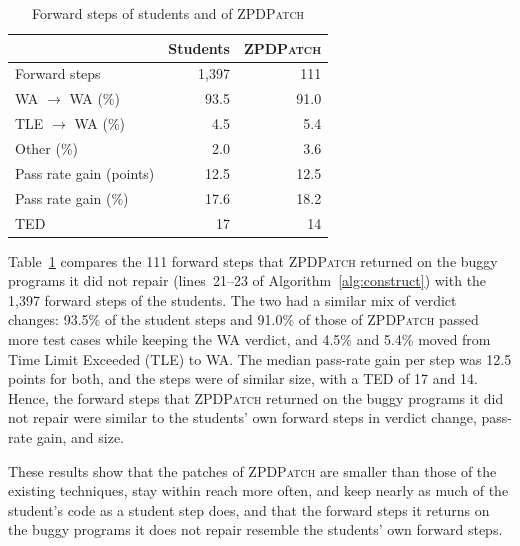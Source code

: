\documentclass[conference]{IEEEtran}
\begin{document}
\begin{table}[h]
\caption{Forward steps of students and of \textsc{ZPDPatch}}
\label{tab:rq1steps}
\centering\footnotesize
\begin{tabular}{@{}l||rr@{}}
\toprule
 & Students & \textsc{ZPDPatch} \\
\midrule
Forward steps & 1,397 & 111 \\
\midrule
WA $\to$ WA (\%) & 93.5 & 91.0 \\
TLE $\to$ WA (\%) & 4.5 & 5.4 \\
Other (\%) & 2.0 & 3.6 \\
\midrule
Pass rate gain (points) & 12.5 & 12.5 \\
Pass rate gain (\%) & 17.6 & 18.2 \\
TED & 17 & 14 \\
\bottomrule
\end{tabular}
\end{table}

Table~\ref{tab:rq1steps} compares the 111 forward steps that \textsc{ZPDPatch} returned on the buggy programs it did not repair (lines~21--23 of Algorithm~\ref{alg:construct}) with the 1,397 forward steps of the students. The two had a similar mix of verdict changes: 93.5\% of the student steps and 91.0\% of those of \textsc{ZPDPatch} passed more test cases while keeping the WA verdict, and 4.5\% and 5.4\% moved from Time Limit Exceeded (TLE) to WA. The median pass-rate gain per step was 12.5 points for both, and the steps were of similar size, with a TED of 17 and 14. Hence, the forward steps that \textsc{ZPDPatch} returned on the buggy programs it did not repair were similar to the students' own forward steps in verdict change, pass-rate gain, and size.

These results show that the patches of \textsc{ZPDPatch} are smaller than those of the existing techniques, stay within reach more often, and keep nearly as much of the student's code as a student step does, and that the forward steps it returns on the buggy programs it does not repair resemble the students' own forward steps.
\end{document}
